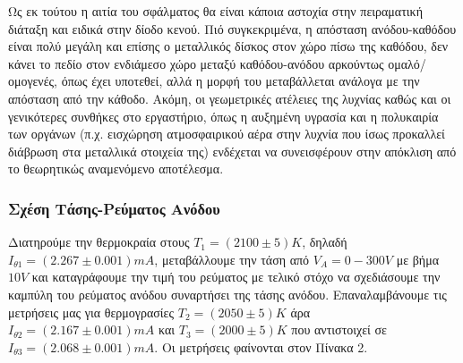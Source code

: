 \documentclass[a4paper]{article}
\begin{document}
Ως εκ τούτου η αιτία του σφάλματος θα είναι κάποια αστοχία στην πειραματική διάταξη και ειδικά στην δίοδο κενού. 
 Πιό συγκεκριμένα, η απόσταση ανόδου-καθόδου είναι πολύ μεγάλη και επίσης ο μεταλλικός δίσκος στον χώρο πίσω της καθόδου, δεν κάνει το πεδίο στον ενδιάμεσο χώρο μεταξύ καθόδου-ανόδου αρκούντως ομαλό/ομογενές, όπως έχει υποτεθεί, αλλά η μορφή του μεταβάλλεται ανάλογα με την απόσταση από την κάθοδο. Ακόμη, οι γεωμετρικές ατέλειες της λυχνίας καθώς και οι γενικότερες συνθήκες στο εργαστήριο, όπως η αυξημένη υγρασία και η πολυκαιρία των οργάνων (π.χ. εισχώρηση ατμοσφαιρικού αέρα στην λυχνία που ίσως προκαλλεί διάβρωση στα μεταλλικά στοιχεία της) ενδέχεται να συνεισφέρουν στην απόκλιση από το θεωρητικώς αναμενόμενο αποτέλεσμα.


\subsubsection*{ Σχέση Τάσης-Ρεύματος Ανόδου}
Διατηρούμε την θερμοκραία στους $T_1=(2100\pm 5)K$, δηλαδή $I_{\theta1} =(2.267\pm0.001)mA$, μεταβάλλουμε την τάση από $V_A=0-300V$ με βήμα $10V$ και καταγράφουμε την τιμή του ρεύματος με τελικό στόχο να σχεδιάσουμε την καμπύλη του ρεύματος ανόδου συναρτήσει της τάσης ανόδου. Επαναλαμβάνουμε τις μετρήσεις μας για θερμογρασίες $T_2=(2050\pm 5)K$ άρα $I_{\theta2} =(2.167\pm0.001)mA$ και $T_3=(2000\pm 5)K$ που αντιστοιχεί σε $I_{\theta3} =(2.068\pm0.001)mA$. Οι μετρήσεις φαίνονται στον Πίνακα 2.
\end{document}
